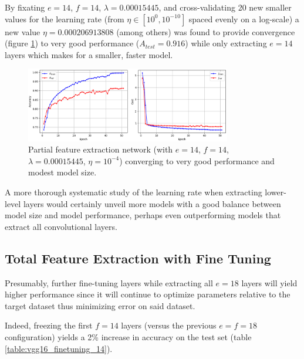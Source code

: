By fixating $e = 14$, $f = 14$, $\lambda = 0.00015445$, and cross-validating 20 new smaller values for the learning rate (from $\eta \in [10^0, 10^{-10}]$ spaced evenly on a log-scale) a new value $\eta = 0.000206913808$ (among others) was found to provide convergence (figure \ref{fig:vgg16_partial_convergence}) to very good performance ($A_{test} = 0.916$) while only extracting $e = 14$ layers which makes for a smaller, faster model.

\begin{figure}[ht]
    \centering
    \includegraphics[width=0.8\textwidth]{figs/vgg16_partial_convergence.png}
    \caption{Partial feature extraction network (with $e = 14$, $f = 14$, $\lambda = 0.00015445$, $\eta = 10^{-4}$) converging to very good performance and modest model size.}
    \label{fig:vgg16_partial_convergence}
\end{figure}


A more thorough systematic study of the learning rate when extracting lower-level layers would certainly unveil more models with a good balance between model size and model performance, perhaps even outperforming models that extract all convolutional layers.

\subsection{Total Feature Extraction with Fine Tuning}

Presumably, further fine-tuning layers while extracting all $e = 18$ layers will yield higher performance since it will continue to optimize parameters relative to the target dataset thus minimizing error on said dataset.

Indeed, freezing the first $f = 14$ layers (versus the previous $e = f = 18$ configuration) yields a 2\% increase in accuracy on the test set (table \ref{table:vgg16_finetuning_14}).

